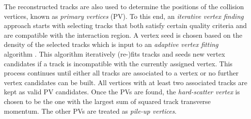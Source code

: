 The reconstructed tracks are also used to determine the positions of the collision vertices, known as \emph{primary vertices} (PV). To this end, an \emph{iterative vertex finding} approach \cite{PERF-2015-01} starts with selecting tracks that both satisfy certain quality criteria and are compatible with the interaction region. A vertex seed is chosen based on the density of the selected tracks which is input to an \emph{adaptive vertex fitting} algorithm .
This algorithm iteratively (re-)fits tracks and seeds new vertex candidates if a track is incompatible with the currently assigned vertex.
This process continues until either all tracks are associated to a vertex or no further vertex candidates can be built.
All vertices with at least two associated tracks are kept as valid PV candidates.
Once the PVs are found, the \emph{hard-scatter vertex} is chosen to be the one with the largest sum of squared track transverse momentum. The other PVs are treated as \emph{pile-up vertices}.






